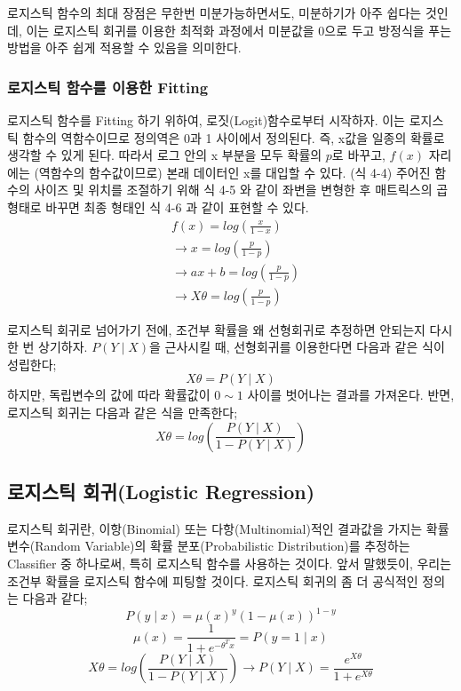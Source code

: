 \documentclass[a4paper]{oblivoir}
\begin{document}
\indent 로지스틱 함수의 최대 장점은 무한번 미분가능하면서도, 미분하기가 아주 쉽다는 것인데,  이는 로지스틱 회귀를 이용한 최적화 과정에서 미분값을 0으로 두고 방정식을 푸는 방법을 아주 쉽게 적용할 수 있음을 의미한다. 

\subsubsection{로지스틱 함수를 이용한 Fitting}
로지스틱 함수를 Fitting 하기 위하여, 로짓(Logit)함수로부터 시작하자. 이는 로지스틱 함수의 역함수이므로 정의역은 0과 1 사이에서 정의된다. 즉, x값을 일종의 확률로 생각할 수 있게 된다. 따라서 로그 안의 x 부분을 모두 확률의 $p$로 바꾸고, $f(x)$ 자리에는 (역함수의 함수값이므로) 본래 데이터인 x를 대입할 수 있다. (식 4-4) 주어진 함수의 사이즈 및 위치를 조절하기 위해 식 4-5 와 같이 좌변을 변형한 후 매트릭스의 곱 형태로 바꾸면 최종 형태인 식 4-6 과 같이 표현할 수 있다.
\begin{align*}
&f(x) = log(\frac{x}{1-x})				\tag{4-3}\\
&\to x=log(\frac{p}{1-p}) 			\tag{4-4}\\
&\to ax+b = log(\frac{p}{1-p})		\tag{4-5}\\
&\to X\theta = log(\frac{p}{1-p})		\tag{4-6}
\end{align*}

\indent 로지스틱 회귀로 넘어가기 전에, 조건부 확률을 왜 선형회귀로 추정하면 안되는지 다시 한 번 상기하자. $P(Y\mid X)$을 근사시킬 때, 선형회귀를 이용한다면 다음과 같은 식이 성립한다; \begin{equation*}X\theta = P(Y\mid X) \tag{4-7}\end{equation*} 하지만, 독립변수의 값에 따라 확률값이 $0 \sim 1$ 사이를 벗어나는 결과를 가져온다. 반면, 로지스틱 회귀는 다음과 같은 식을 만족한다; \begin{equation*}X\theta = log \left( \frac{P(Y\mid X)}{1-P(Y\mid X)} \right) \tag{4-8}\end{equation*}

\subsection{로지스틱 회귀(Logistic Regression)}
로지스틱 회귀란, 이항(Binomial) 또는 다항(Multinomial)적인 결과값을 가지는 확률 변수(Random Variable)의 확률 분포(Probabilistic Distribution)를 추정하는 Classifier 중 하나로써, 특히 로지스틱 함수를 사용하는 것이다. 앞서 말했듯이, 우리는 조건부 확률을 로지스틱 함수에 피팅할 것이다. 로지스틱 회귀의 좀 더 공식적인 정의는 다음과 같다;
\begin{equation*}
P(y \mid x) = \mu(x)^{y}(1-\mu(x))^{1-y}				\tag{4-9}
\end{equation*}
\begin{equation*}
\mu(x) = \frac{1}{1+e^{-\theta^{T}x}} = P(y=1 \mid x)	\tag{4-10}
\end{equation*}
\begin{equation*}
X\theta = log\left(\frac{P(Y \mid X)}{1- P(Y \mid X)}\right) \to P(Y \mid X) = \frac{e^{X\theta}}{1+e^{X\theta}} \tag{4-11}
\end{equation*}
\end{document}
